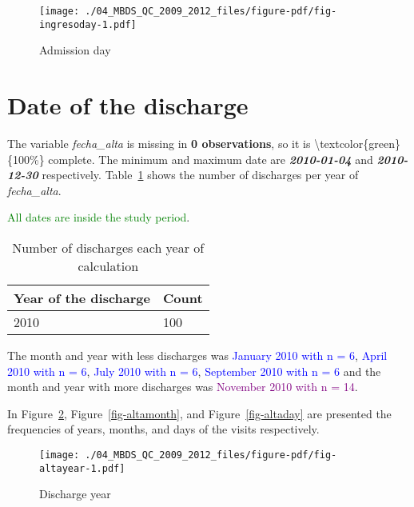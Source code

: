 \documentclass[
  letterpaper,
  DIV=11,
  numbers=noendperiod]{scrreprt}
\begin{document}
\begin{figure}

{\centering \texttt{[image: ./04\_MBDS\_QC\_2009\_2012\_files/figure-pdf/fig-ingresoday-1.pdf]}

}

\caption{\label{fig-ingresoday}Admission day}

\end{figure}

\hypertarget{date-of-the-discharge}{%
\section{Date of the discharge}\label{date-of-the-discharge}}

The variable \emph{fecha\_alta} is missing in \textbf{0 observations},
so it is \textbackslash textcolor\{green\}\{100\%\} complete. The
minimum and maximum date are \textbf{\emph{2010-01-04}} and
\textbf{\emph{2010-12-30}} respectively. Table~\ref{tbl-fechaalta} shows
the number of discharges per year of \emph{fecha\_alta}.

\textcolor{green}{All dates are inside the study period}.

\hypertarget{tbl-fechaalta}{}
\begin{longtable}{ll}
\caption{\label{tbl-fechaalta}Number of discharges each year of calculation }\tabularnewline

\toprule
Year of the discharge & Count \\ 
\midrule
2010 & 100 \\ 
\bottomrule
\end{longtable}

The month and year with less discharges was
\textcolor{blue}{January 2010 with n = 6},
\textcolor{blue}{April 2010 with n = 6},
\textcolor{blue}{July 2010 with n = 6},
\textcolor{blue}{September 2010 with n = 6} and the month and year with
more discharges was \textcolor{purple}{November 2010 with n = 14}.

In Figure~\ref{fig-altayear}, Figure~\ref{fig-altamonth}, and
Figure~\ref{fig-altaday} are presented the frequencies of years, months,
and days of the visits respectively.

\begin{figure}

{\centering \texttt{[image: ./04\_MBDS\_QC\_2009\_2012\_files/figure-pdf/fig-altayear-1.pdf]}

}

\caption{\label{fig-altayear}Discharge year}

\end{figure}
\end{document}
